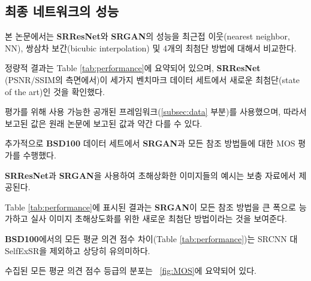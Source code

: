 \documentclass[10pt,twocolumn,letterpaper]{article}
\newcommand{\kor}[1]{#1}
\newcommand{\eng}[1]{}
\begin{document}
\subsection{\eng{Performance of the final networks}\kor{최종 네트워크의 성능}}
\label{subsec:msebased}
\eng{
We compare the performance of \textbf{SRResNet} and \textbf{SRGAN} to NN, bicubic interpolation, and four state-of-the-art methods.
}\kor{
본 논문에서는 \textbf{SRResNet}와 \textbf{SRGAN}의 성능을 최근접 이웃(nearest neighbor, NN), 쌍삼차 보간(bicubic interpolation) 및 4개의 최첨단 방법에 대해서 비교한다.
}
\eng{
Quantitative results are summarized in Table \ref{tab:performance} and confirm that \textbf{SRResNet} (in terms of PSNR/SSIM) sets a new state of the art on three benchmark datasets.
}\kor{
정량적 결과는 Table \ref{tab:performance}에 요약되어 있으며, \textbf{SRResNet} (PSNR/SSIM의 측면에서)이 세가지 벤치마크 데이터 세트에서 새로운 최첨단(state of the art)인 것을 확인했다.
}
\eng{
Please note that we used a publicly available framework for evaluation (\cf Section \ref{subsec:data}), reported values might thus slightly deviate from those reported in the original papers.
}\kor{
평가를 위해 사용 가능한 공개된 프레임워크(\cf \ref{subsec:data} 부분)를 사용했으며, 따라서 보고된 값은 원래 논문에 보고된 값과 약간 다를 수 있다.
}

\eng{
We further obtained \ac{MOS} ratings for \textbf{SRGAN} and all reference methods on \textbf{BSD100}.
}\kor{
추가적으로 \textbf{BSD100} 데이터 세트에서 \textbf{SRGAN}과 모든 참조 방법들에 대한 \ac{MOS} 평가를 수행했다.
} \eng{
Examples of images super-resolved with \textbf{SRResNet} and \textbf{SRGAN} are depicted in the supplementary material.
}\kor{
\textbf{SRResNet}과 \textbf{SRGAN}을 사용하여 초해상화한 이미지들의 예시는 보충 자료에서 제공된다.
}
\eng{
The results shown in Table \ref{tab:performance} confirm that \textbf{SRGAN} outperforms all reference methods by a large margin and sets a new state of the art for photo-realistic image \ac{SR}.
}\kor{
Table \ref{tab:performance}에 표시된 결과는 \textbf{SRGAN}이 모든 참조 방법을 큰 폭으로 능가하고 실사 이미지 초해상도화를 위한 새로운 최첨단 방법이라는 것을 보여준다.
} \eng{
All differences in \ac{MOS} (\cf Table \ref{tab:performance}) are highly significant on \textbf{BSD100}, except SRCNN vs. SelfExSR.
}\kor{
\textbf{BSD100}에서의 모든 \ac{평균 의견 점수} 차이(\cf Table \ref{tab:performance})는 SRCNN 대 SelfExSR을 제외하고 상당히 유의미하다.
} \eng{
The distribution of all collected \ac{MOS} ratings is summarized in \figurename~\ref{fig:MOS}.
}\kor{
수집된 모든 \ac{평균 의견 점수} 등급의 분포는 \figurename~\ref{fig:MOS}에 요약되어 있다.
}
\end{document}
